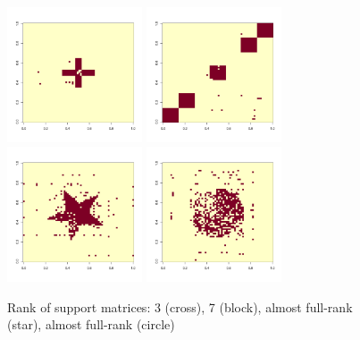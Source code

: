 \documentclass[11pt]{article}
\theoremstyle{definition}
\begin{document}
\begin{figure}[ht]
    \centering
   \includegraphics[width=4cm]{est_cross.pdf}
          \includegraphics[width=4cm]{est_block.pdf}
        \includegraphics[width=4cm]{est_star.pdf}
          \includegraphics[width=4cm]{est_circle.pdf}
 \caption{Rank of support matrices: 3 (cross), 7 (block), almost full-rank (star), almost full-rank (circle)}\label{fig:compare2}
\end{figure}
\end{document}
